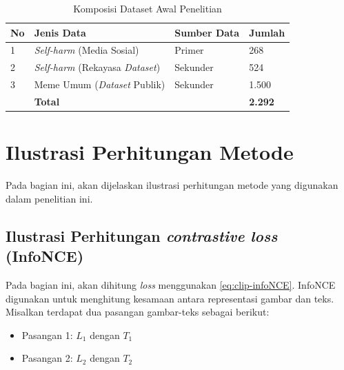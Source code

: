 \begin{table}[H]
    \centering
    \caption{Komposisi Dataset Awal Penelitian}
    \label{tabel:komposisi_dataset}
    \small
    \setlength{\tabcolsep}{3pt}
    \renewcommand{\arraystretch}{1.1}
    \begin{tabular}{p{0.6cm} p{3.8cm} p{1.6cm} p{1.4cm}}
        \hline
        \textbf{No} & {\raggedright \textbf{Jenis Data}\par} & \textbf{Sumber Data} & \textbf{Jumlah} \\
        \hline
        1 & {\raggedright \textit{Self-harm} (Media Sosial)\par} & Primer & 268 \\
        2 & {\raggedright \textit{Self-harm} (Rekayasa \textit{Dataset})\par} & Sekunder & 524 \\
        3 & {\raggedright Meme Umum (\textit{Dataset} Publik)\par} & Sekunder & 1.500 \\
        \hline
        & {\raggedright \textbf{Total}\par} & & \textbf{2.292} \\
        \hline
    \end{tabular}
\end{table}

\section{Ilustrasi Perhitungan Metode} \label{sec:ilustrasi_perhitungan_metode}
Pada bagian ini, akan dijelaskan ilustrasi perhitungan metode yang digunakan dalam penelitian ini.


\subsection{Ilustrasi Perhitungan \textit{contrastive loss} (InfoNCE)} \label{subsec:ilustrasi_perhitungan_infonce}
Pada bagian ini, akan dihitung \textit{loss} menggunakan \ref{eq:clip-infoNCE}. InfoNCE digunakan untuk menghitung kesamaan antara representasi gambar dan teks. 
Misalkan terdapat dua pasangan gambar-teks sebagai berikut:
\begin{itemize}
    \item Pasangan 1: $L_1$ dengan $T_1$
    \item Pasangan 2: $L_2$ dengan $T_2$
\end{itemize}

